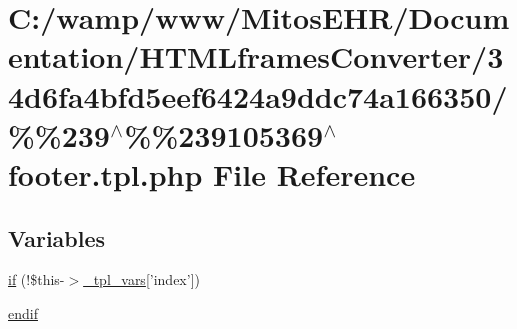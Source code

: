 \hypertarget{34d6fa4bfd5eef6424a9ddc74a166350_2_06_06239_05_06_06239105369_05footer_8tpl_8php}{\section{\-C\-:/wamp/www/\-Mitos\-E\-H\-R/\-Documentation/\-H\-T\-M\-Lframes\-Converter/34d6fa4bfd5eef6424a9ddc74a166350/\%\%239$^\wedge$\%\%239105369$^\wedge$footer.tpl.\-php \-File \-Reference}
\label{34d6fa4bfd5eef6424a9ddc74a166350_2_06_06239_05_06_06239105369_05footer_8tpl_8php}
}
\subsection*{\-Variables}
\begin{DoxyCompactItemize}
\item 
\hyperlink{34d6fa4bfd5eef6424a9ddc74a166350_2_06_06239_05_06_06239105369_05footer_8tpl_8php_ac88ce6836416eb9d767d617090a64744}{if} (!\$this-\/$>$\hyperlink{_06_06127_05_06_0612781687_05pkgelementindex_8tpl_8php_a4a4846d8e68d455590131a05697f67a3}{\-\_\-tpl\-\_\-vars}\mbox{[}'index'\mbox{]})
\item 
\hyperlink{34d6fa4bfd5eef6424a9ddc74a166350_2_06_06239_05_06_06239105369_05footer_8tpl_8php_a82cd33ca97ff99f2fcc5e9c81d65251b}{endif}
\end{DoxyCompactItemize}


